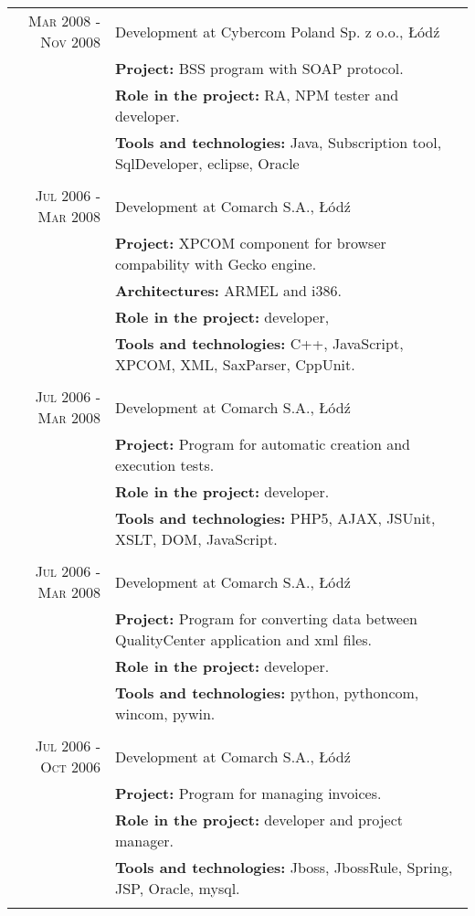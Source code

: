 \documentclass[a4paper,9pt]{article} %
\begin{document}
\begin{longtable}{r|p{11cm}}
\textsc{Mar 2008 - Nov 2008} & Development at Cybercom Poland Sp. z o.o., Łódź\\
& \textbf{Project:} BSS program with SOAP protocol.\\
& \textbf{Role in the project:} RA, NPM tester and developer.\\
& \textbf{Tools and technologies:} Java, Subscription tool, SqlDeveloper, eclipse, Oracle\\
\multicolumn{2}{c}{} \\

\textsc{Jul 2006 - Mar 2008} & Development at Comarch S.A., Łódź\\
& \textbf{Project:} XPCOM component for browser compability with Gecko engine.\\
& \textbf{Architectures:} ARMEL and i386.\\
& \textbf{Role in the project:} developer, \\
& \textbf{Tools and technologies:} C++, JavaScript, XPCOM, XML, SaxParser, CppUnit.\\
\multicolumn{2}{c}{} \\

\textsc{Jul 2006 - Mar 2008} & Development at Comarch S.A., Łódź\\
& \textbf{Project:} Program for automatic creation and execution tests.\\
& \textbf{Role in the project:} developer.\\
& \textbf{Tools and technologies:} PHP5, AJAX, JSUnit, XSLT, DOM, JavaScript.\\
\multicolumn{2}{c}{} \\

\textsc{Jul 2006 - Mar 2008} & Development at Comarch S.A., Łódź\\
& \textbf{Project:} Program for converting data between QualityCenter application and xml files.\\
& \textbf{Role in the project:} developer.\\
& \textbf{Tools and technologies:} python, pythoncom, wincom, pywin.\\
\multicolumn{2}{c}{} \\

\textsc{Jul 2006 - Oct 2006} & Development at Comarch S.A., Łódź\\
& \textbf{Project:} Program for managing invoices.\\
& \textbf{Role in the project:} developer and project manager.\\
& \textbf{Tools and technologies:} Jboss, JbossRule, Spring, JSP, Oracle, mysql.\\
\multicolumn{2}{c}{} \\


\end{longtable}
\end{document}
